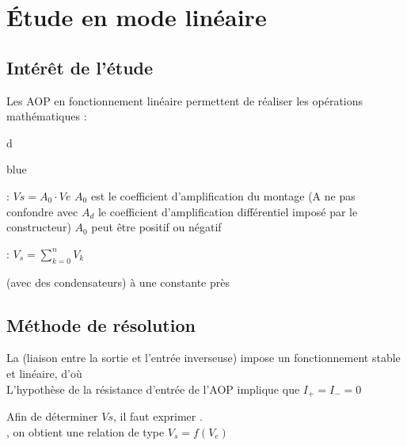 

\chapter{Étude en mode linéaire}
\section{Intérêt de l’étude }

Les AOP en fonctionnement linéaire permettent de réaliser les opérations mathématiques :

d\begin{items}{blue}{\Triangle}
  \item {} : $Vs=A_0 \cdot Ve$
  $A_0$ est le coefficient d’amplification du montage (A ne pas confondre avec $A_d$ le coefficient d’amplification différentiel 
  imposé par le constructeur)
  $A_0$ peut être positif ou négatif
  \item {} : $V_s=\sum_{k=0}^{n} V_k$
  \item {} (avec des condensateurs) à une constante près
  \item {}
\end{items}

\section{Méthode de résolution}
La  (liaison entre la sortie et l’entrée inverseuse) impose un fonctionnement stable et linéaire, 
d'où  \\

L’hypothèse de la résistance d’entrée de l’AOP implique que $I_+=I_-=0$

Afin de déterminer $Vs$, il faut exprimer . \\

, on obtient une relation de type $V_s = f(V_e)$


